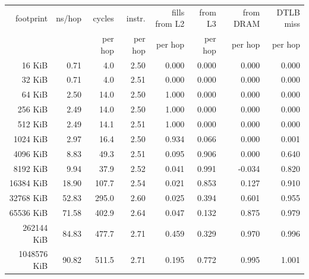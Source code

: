 \begin{tabular}{rrrrrrrr}
\toprule
footprint & ns/hop & cycles & instr. & fills from L2 & from L3 & from DRAM & DTLB miss \\
 & & per hop & per hop & per hop & per hop & per hop & per hop \\
\midrule
16 KiB & 0.71 & 4.0 & 2.50 & 0.000 & 0.000 & 0.000 & 0.000 \\
32 KiB & 0.71 & 4.0 & 2.51 & 0.000 & 0.000 & 0.000 & 0.000 \\
64 KiB & 2.50 & 14.0 & 2.50 & 1.000 & 0.000 & 0.000 & 0.000 \\
256 KiB & 2.49 & 14.0 & 2.50 & 1.000 & 0.000 & 0.000 & 0.000 \\
512 KiB & 2.49 & 14.1 & 2.51 & 1.000 & 0.000 & 0.000 & 0.000 \\
1024 KiB & 2.97 & 16.4 & 2.50 & 0.934 & 0.066 & 0.000 & 0.001 \\
4096 KiB & 8.83 & 49.3 & 2.51 & 0.095 & 0.906 & 0.000 & 0.640 \\
8192 KiB & 9.94 & 37.9 & 2.52 & 0.041 & 0.991 & -0.034 & 0.820 \\
16384 KiB & 18.90 & 107.7 & 2.54 & 0.021 & 0.853 & 0.127 & 0.910 \\
32768 KiB & 52.83 & 295.0 & 2.60 & 0.025 & 0.394 & 0.601 & 0.955 \\
65536 KiB & 71.58 & 402.9 & 2.64 & 0.047 & 0.132 & 0.875 & 0.979 \\
262144 KiB & 84.83 & 477.7 & 2.71 & 0.459 & 0.329 & 0.970 & 0.996 \\
1048576 KiB & 90.82 & 511.5 & 2.71 & 0.195 & 0.772 & 0.995 & 1.001 \\
\bottomrule
\end{tabular}
